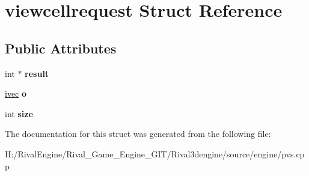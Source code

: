 \hypertarget{structviewcellrequest}{}\section{viewcellrequest Struct Reference}
\label{structviewcellrequest}
\subsection*{Public Attributes}
\begin{DoxyCompactItemize}
\item 
\mbox{\label{structviewcellrequest_ad2e1a23943e810b83c92e0ba4cb8d23b}} 
int $\ast$ {\bfseries result}
\item 
\mbox{\label{structviewcellrequest_ae56f6d047bb45070524258855545b60c}} 
\hyperlink{structivec}{ivec} {\bfseries o}
\item 
\mbox{\label{structviewcellrequest_a8c3711c6b52631328871575367bc5034}} 
int {\bfseries size}
\end{DoxyCompactItemize}


The documentation for this struct was generated from the following file\+:\begin{DoxyCompactItemize}
\item 
H\+:/\+Rival\+Engine/\+Rival\+\_\+\+Game\+\_\+\+Engine\+\_\+\+G\+I\+T/\+Rival3dengine/source/engine/pvs.\+cpp\end{DoxyCompactItemize}

